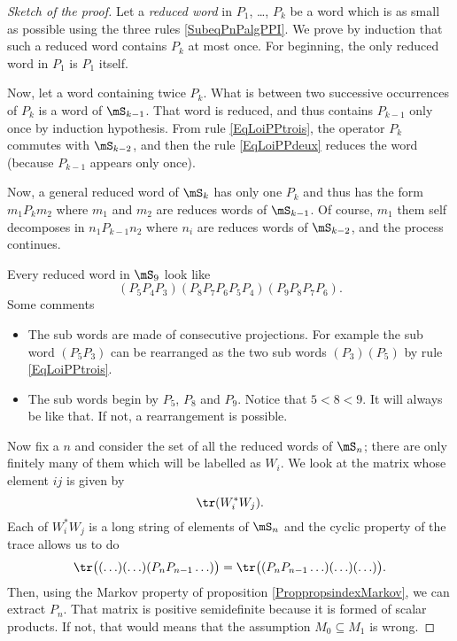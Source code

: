 \begin{proof}[Sketch of the proof]
Let a \emph{reduced word} in $P_1$, \ldots, $P_k$ be a word which is as small as possible using the three rules \eqref{SubeqPnPalgPPI}. We prove by induction that such a reduced word contains $P_k$ at most once. For beginning, the only reduced word in $P_1$ is $P_1$ itself. 

Now, let a word containing twice $P_k$. What is between two successive occurrences of $P_k$ is a word of $\mS_{k-1}$. That word is reduced, and thus contains $P_{k-1}$ only once by induction hypothesis. From rule \eqref{EqLoiPPtrois}, the operator $P_k$ commutes with $\mS_{k-2}$, and then the rule \eqref{EqLoiPPdeux} reduces the word (because $P_{k-1}$ appears only once).


Now, a general reduced word of $\mS_k$ has only one $P_k$ and thus has the form $m_1 P_k m_2$ where $m_1$ and $m_2$ are reduces words of $\mS_{k-1}$. Of course, $m_1$ them self decomposes in $n_{1} P_{k-1} n_2$ where $n_i$ are reduces words of $\mS_{k-2}$, and the process continues.

Every reduced word in $\mS_9$ look like
\begin{equation}
	(P_5P_4P_3)(P_8P_7P_6P_5P_4)(P_9P_8P_7P_6).
\end{equation}
Some comments
\begin{itemize}
\item The sub words are made of consecutive projections. For example the sub word $(P_5P_3)$ can be rearranged as the two sub words $(P_3)(P_5)$ by rule \eqref{EqLoiPPtrois}.
\item The sub words begin by $P_5$, $P_8$ and $P_9$. Notice that $5<8<9$. It will always be like that. If not, a rearrangement is possible.
\end{itemize}
Now fix a $n$ and consider the set of all the reduced words of $\mS_n$; there are only finitely many of them which will be labelled as $W_i$. We look at the matrix whose element $ij$ is given by
\begin{equation}		\label{EqMtrWWtr}
	\tr(W_i^*W_j).
\end{equation}
Each of $W_i^*W_j$ is a long string of elements of $\mS_n$ and the cyclic property of the trace allows us to do
\begin{equation}
	\tr\big( (\ldots)(\ldots)(P_nP_{n-1}\ldots) \big)=\tr\big( (P_nP_{n-1}\ldots)(\ldots)(\ldots)  \big).
\end{equation}
Then, using the Markov property of proposition \ref{ProppropsindexMarkov}, we can extract $P_n$. That matrix is positive semidefinite because it is formed of scalar products. If not, that would means that the assumption $M_0\subseteq M_1$ is wrong.

\end{proof}

